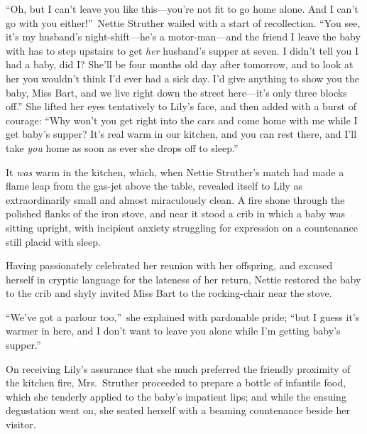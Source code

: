 \documentclass[12pt,a4paper]{book}
\begin{document}
``Oh, but I can't leave you like this---you're not fit to go home
alone. And I can't go with you either!''\ Nettie Struther wailed
with a start of recollection. ``You see, it's my husband's
night-shift---he's a motor-man---and the friend I leave the baby
with has to step upstairs to get \textit{her} husband's supper at seven. I
didn't tell you I had a baby, did I? She'll be four months old
day after tomorrow, and to look at her you wouldn't think I'd
ever had a sick day. I'd give anything to show you the baby, Miss
Bart, and we live right down the street here---it's only three
blocks off.'' She lifted her eyes tentatively to Lily's face, and
then added with a burst of courage: ``Why won't you get right into
the cars and come home with me while I get baby's supper? 
It's real warm in our kitchen, and you can rest there, and I'll
take \textit{you} home as soon as ever she drops off to sleep.''





It \textit{was} warm in the kitchen, which, when Nettie Struther's match
had made a flame leap from the gas-jet above the table, revealed
itself to Lily as extraordinarily small and almost miraculously
clean. A fire shone through the polished flanks of the iron
stove, and near it stood a crib in which a baby was sitting
upright, with incipient anxiety struggling for expression on a
countenance still placid with sleep.





Having passionately celebrated her reunion with her offspring,
and excused herself in cryptic language for the lateness of her
return, Nettie restored the baby to the crib and shyly invited
Miss Bart to the rocking-chair near the stove.





``We've got a parlour too,''\ she explained with pardonable pride;
``but I guess it's warmer in here, and I don't want to leave you
alone while I'm getting baby's supper.''





On receiving Lily's assurance that she much preferred the
friendly proximity of the kitchen fire, Mrs.\ Struther proceeded
to prepare a bottle of infantile food, which she tenderly applied
to the baby's impatient lips; and while the ensuing degustation
went on, she seated herself with a beaming countenance beside her
visitor.
\end{document}
